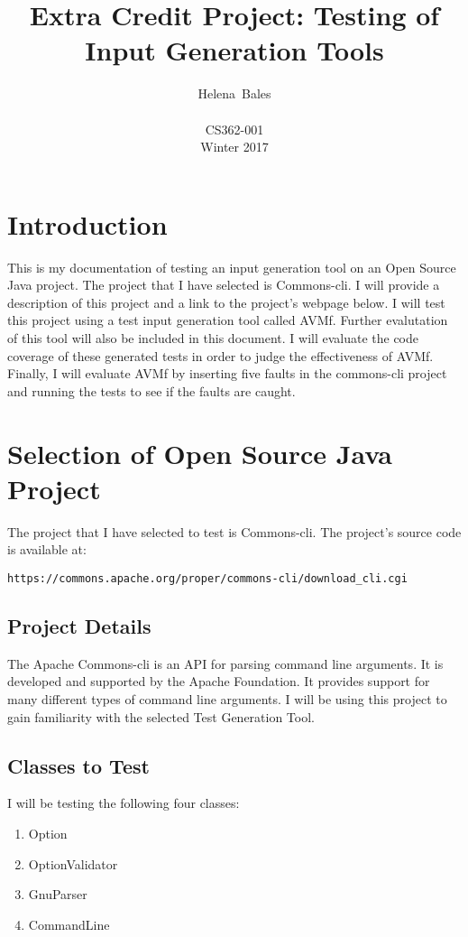 \documentclass[letterpaper,10pt]{article}
\title{Extra Credit Project: Testing of Input Generation Tools}
\author{Helena~Bales\\ \\ CS362-001 \\ Winter 2017}
\begin{document}
\maketitle

\clearpage
\tableofcontents
\clearpage

\section{Introduction}
This is my documentation of testing an input generation tool on an Open Source Java project. 
The project that I have selected is Commons-cli. I will provide a description of this project and a 
link to the project's webpage below. I will test this project using a test input generation tool 
called AVMf. Further evalutation of this tool will also be included in this document. I will 
evaluate the code coverage of these generated tests in order to judge the effectiveness of AVMf. 
Finally, I will evaluate AVMf by inserting five faults in the commons-cli project and running the 
tests to see if the faults are caught.

\section{Selection of Open Source Java Project}
The project that I have selected to test is Commons-cli. The project's source code is available at: 
\begin{lstlisting}
https://commons.apache.org/proper/commons-cli/download_cli.cgi
\end{lstlisting}

	\subsection{Project Details}
	The Apache Commons-cli is an API for parsing command line arguments. It is developed and 
	supported by the Apache Foundation. It provides support for many different types of 
	command line arguments. I will be using this project to gain familiarity with the 
	selected Test Generation Tool.
	\subsection{Classes to Test}
	I will be testing the following four classes:
	\begin{enumerate}
		\item{Option}
		\item{OptionValidator}
		\item{GnuParser}
		\item{CommandLine}
	\end{enumerate}
\end{document}
